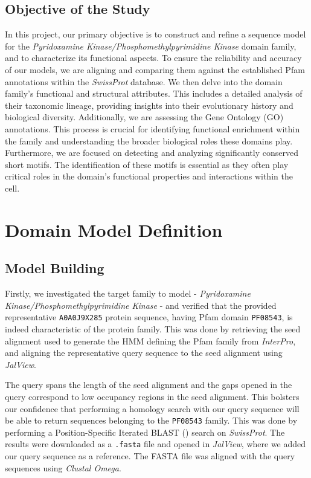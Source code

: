 \documentclass[10pt,twocolumn,letterpaper]{article}
\begin{document}
\subsection{Objective of the Study}

In this project, our primary objective is to construct and refine a sequence model for the \textit{Pyridoxamine Kinase/Phosphomethylpyrimidine Kinase} domain family, and to characterize its functional aspects. To ensure the reliability and accuracy of our models, we are aligning and comparing them against the established Pfam annotations within the \textit{SwissProt} database. We then delve into the domain family's functional and structural attributes. This includes a detailed analysis of their taxonomic lineage, providing insights into their evolutionary history and biological diversity. Additionally, we are assessing the Gene Ontology (GO) annotations. This process is crucial for identifying functional enrichment within the family and understanding the broader biological roles these domains play. Furthermore, we are focused on detecting and analyzing significantly conserved short motifs. The identification of these motifs is essential as they often play critical roles in the domain's functional properties and interactions within the cell.

\section{Domain Model Definition}

\subsection{Model Building}

Firstly, we investigated the target family to model - \textit{Pyridoxamine Kinase/Phosphomethylpyrimidine Kinase} - and verified that the provided representative \texttt{A0A0J9X285}\cite{representative_protein} protein sequence, having Pfam domain \texttt{PF08543}, is indeed characteristic of the protein family. 
This was done by retrieving the seed alignment used to generate the HMM defining the Pfam family from \textit{InterPro}, and aligning the representative query sequence to the seed alignment using \textit{JalView}.

The query spans the length of the seed alignment and the gaps opened in the query correspond to low occupancy regions in the seed alignment. This bolsters our confidence that performing a homology search with our query sequence will be able to return sequences belonging to the \texttt{PF08543} family. This was done by performing a Position-Specific Iterated BLAST () search on \textit{SwissProt}. The results were downloaded as a \texttt{.fasta} file and opened in \textit{JalView}, where we added our query sequence as a reference. The FASTA file was aligned with the query sequences using \textit{Clustal Omega}.
\end{document}
